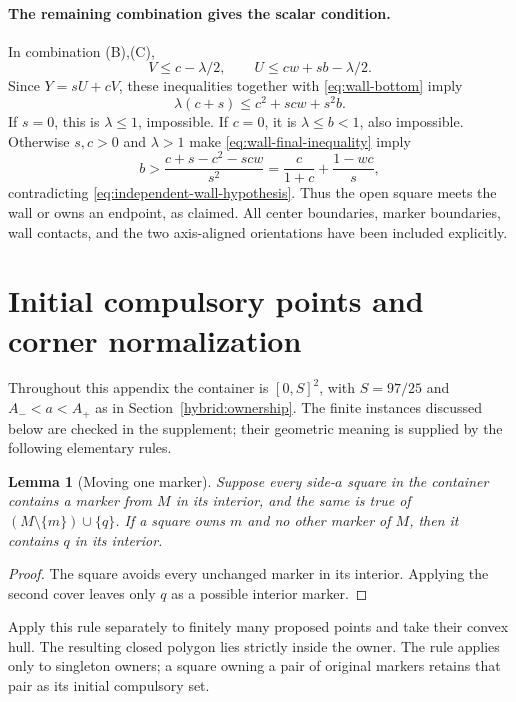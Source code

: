 \documentclass[11pt]{article}
\newtheorem{lemma}[theorem]{Lemma}
\begin{document}
\paragraph{The remaining combination gives the scalar condition.}
In combination (B),(C),
\[
 V\le c-\lambda/2,\qquad U\le cw+sb-\lambda/2.
\]
Since $Y=sU+cV$, these inequalities together with
\eqref{eq:wall-bottom} imply
\begin{equation}\label{eq:wall-final-inequality}
 \lambda(c+s)\le c^2+scw+s^2b.
\end{equation}
If $s=0$, this is $\lambda\le1$, impossible. If $c=0$, it is
$\lambda\le b<1$, also impossible. Otherwise $s,c>0$ and
$\lambda>1$ make \eqref{eq:wall-final-inequality} imply
\[
 b>\frac{c+s-c^2-scw}{s^2}
   =\frac{c}{1+c}+\frac{1-wc}{s},
\]
contradicting \eqref{eq:independent-wall-hypothesis}.
Thus the open square meets the wall or owns an endpoint, as claimed.
All center boundaries, marker boundaries, wall contacts, and the two
axis-aligned orientations have been included explicitly.



\section{Initial compulsory points and corner normalization}
\label{app:initial-corners}
Throughout this appendix the container is $[0,S]^2$, with
$S=97/25$ and $A_-<a<A_+$ as in Section~\ref{hybrid:ownership}.
The finite instances discussed below are checked in the supplement; their
geometric meaning is supplied by the following elementary rules.

\begin{lemma}[Moving one marker]\label{lem:moving-marker}
Suppose every side-$a$ square in the container contains a marker from
$M$ in its interior, and the same is true of
$(M\setminus\{m\})\cup\{q\}$. If a square owns $m$ and no other
marker of $M$, then it contains $q$ in its interior.
\end{lemma}
\begin{proof}
The square avoids every unchanged marker in its interior. Applying the
second cover leaves only $q$ as a possible interior marker.
\end{proof}
Apply this rule separately to finitely many proposed points and take their
convex hull. The resulting closed polygon lies strictly inside the owner.
The rule applies only to singleton owners; a square owning a pair of
original markers retains that pair as its initial compulsory set.
\end{document}
